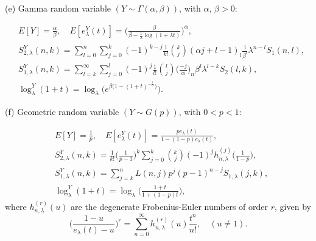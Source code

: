 \documentclass[a4paper,11pt]{amsart}
\begin{document}
(e) Gamma random variable $(Y \sim \Gamma(\alpha, \beta))$, with $\alpha,\, \beta >0$: \par
\begin{align*}
&E[Y]=\frac{\alpha}{\beta},  \quad  E[e_{\lambda}^{Y}(t)]= \bigg(\frac{\beta}{\beta-\frac{1}{\lambda}\log(1+\lambda t)}\bigg)^{\alpha},  \\
&S_{2,\lambda}^{Y}(n,k)= \sum_{l=0}^{n}\sum_{j=0}^{k}(-1)^{k-j}\frac{1}{k!}\binom{k}{j}(\alpha j+l-1)_{l}\frac{1}{\beta^{l}}\lambda^{n-l}S_{1}(n,l), \\     
&S_{1,\lambda}^{Y}(n,k)= \sum_{l=k}^{\infty}\sum_{j=0}^{l}(-1)^{j}\frac{1}{l!}\binom{l}{j}\Big(\frac{-j}{\alpha}\Big)_{n}\beta^{l}\lambda^{l-k}S_{2}(l,k), \\
&\log_{\lambda}^{Y}(1+t)=\log_{\lambda}\Big(e^{\beta\big(1-(1+t)^{-\frac{1}{\alpha}}\big)}\Big).
\end{align*}

(f) Geometric random variable $(Y \sim G(p))$, with $0<p<1$: \par
\begin{align*}
&E[Y]= \frac{1}{p},  \quad   E[e_{\lambda}^{Y}(t)]= \frac{pe_{\lambda}(t)}{1-(1-p)e_{\lambda}(t)},    \\
&S_{2,\lambda}^{Y}(n,k)= \frac{1}{k!}\Big(\frac{1}{p-1}\Big)^{k}\sum_{j=0}^{k}\binom{k}{j}(-1)^{j}h_{n,\lambda}^{(j)}\Big(\frac{1}{1-p}\Big), \\  
&S_{1,\lambda}^{Y}(n,k)=\sum_{j=k}^{n}L(n,j)p^{j}(p-1)^{n-j}S_{1,\lambda}(j,k), \\
&\log_{\lambda}^{Y}(1+t)=\log_{\lambda}\Big(\frac{1+t}{1+(1-p)t}\Big),
\end{align*}
where $h_{n,\lambda}^{(r)}(u)$ are the degenerate Frobenius-Euler numbers of order $r$, given by
\begin{equation*}
\Big(\frac{1-u}{e_{\lambda}(t)-u} \Big)^{r}=\sum_{n=0}^{\infty} h_{n,\lambda}^{(r)}(u)\frac{t^{n}}{n!}, \quad (u \ne 1). 
\end{equation*}
\end{document}
